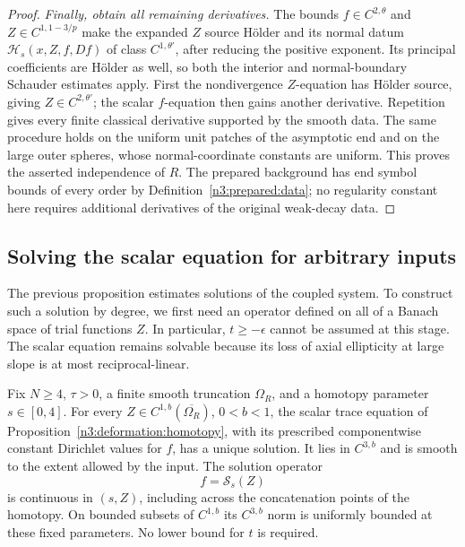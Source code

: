 \begin{proof}
\emph{Finally, obtain all remaining derivatives.}
The bounds $f\in C^{2,\theta}$ and $Z\in C^{1,1-3/p}$ make the
expanded $Z$ source H\"older and its normal datum
$\mathcal H_s(x,Z,f,Df)$ of class $C^{1,\theta'}$, after reducing
the positive exponent. Its principal coefficients are H\"older as
well, so both the interior and normal-boundary Schauder estimates apply.
First the nondivergence $Z$-equation has H\"older source, giving
$Z\in C^{2,\theta'}$; the scalar $f$-equation then gains another
derivative.  Repetition gives every finite classical derivative
supported by the smooth data.  The same procedure holds on the
uniform unit patches of the asymptotic end and on the large outer
spheres, whose normal-coordinate constants are uniform.  This
proves the asserted independence of $R$.  The prepared background has end symbol bounds of every order by
Definition~\ref{n3:prepared:data}; no regularity constant here
requires additional derivatives of the original weak-decay data.
\end{proof}

\subsection{Solving the scalar equation for arbitrary inputs}

The previous proposition estimates solutions of the coupled system.
To construct such a solution by degree, we first need an operator
defined on all of a Banach space of trial functions $Z$. In
particular, $t\ge-\epsilon$ cannot be assumed at this stage.
The scalar equation remains solvable because its loss of axial
ellipticity at large slope is at most reciprocal-linear.

\begin{lemma}
\label{n3:existence:scalar-solve}
Fix $N\ge4$, $\tau>0$, a finite smooth truncation $\Omega_R$,
and a homotopy parameter $s\in[0,4]$.  For every
$Z\in C^{1,b}(\overline{\Omega_R})$, $0<b<1$, the scalar trace
equation of Proposition~\ref{n3:deformation:homotopy}, with its
prescribed componentwise constant Dirichlet values for $f$, has a
unique solution.  It lies in $C^{3,b}$ and is smooth to the extent
allowed by the input.  The solution operator
\begin{equation}\label{n3:existence:scalar-operator}
 f=\mathcal S_s(Z)
\end{equation}
is continuous in $(s,Z)$, including across the concatenation points
of the homotopy.  On bounded subsets of $C^{1,b}$ its $C^{3,b}$
norm is uniformly bounded at these fixed parameters.  No lower
bound for $t$ is required.
\end{lemma}

